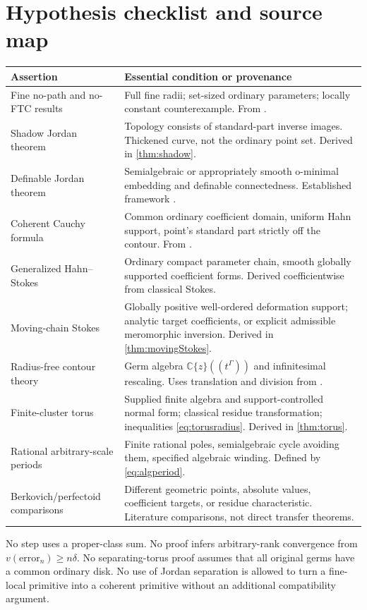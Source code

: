 \documentclass[11pt,letterpaper]{article}
\theoremstyle{definition}
\theoremstyle{remark}
\newcommand{\C}{\mathbb C}
\numberwithin{equation}{section}
\begin{document}
\section{Hypothesis checklist and source map}\label{app:audit}
\begin{center}\small
\begin{longtable}{@{}L{0.28\textwidth}L{0.62\textwidth}@{}}
\toprule
Assertion & Essential condition or provenance\\
\midrule
\endhead
Fine no-path and no-FTC results & Full fine radii; set-sized ordinary parameters; locally constant counterexample. From \cite[\S3]{SA}.\\[0.45em]
Shadow Jordan theorem & Topology consists of standard-part inverse images. Thickened curve, not the ordinary point set. Derived in \cref{thm:shadow}.\\[0.45em]
Definable Jordan theorem & Semialgebraic or appropriately smooth o-minimal embedding and definable connectedness. Established framework \cite{BO}.\\[0.45em]
Coherent Cauchy formula & Common ordinary coefficient domain, uniform Hahn support, point's standard part strictly off the contour. From \cite[\S6]{SA}.\\[0.45em]
Generalized Hahn--Stokes & Ordinary compact parameter chain, smooth globally supported coefficient forms. Derived coefficientwise from classical Stokes.\\[0.45em]
Moving-chain Stokes & Globally positive well-ordered deformation support; analytic target coefficients, or explicit admissible meromorphic inversion. Derived in \cref{thm:movingStokes}.\\[0.45em]
Radius-free contour theory & Germ algebra $\C\{z\}((t^\Gamma))$ and infinitesimal rescaling. Uses translation and division from \cite{AG}.\\[0.45em]
Finite-cluster torus & Supplied finite algebra and support-controlled normal form; classical residue transformation; inequalities \eqref{eq:torusradius}. Derived in \cref{thm:torus}.\\[0.45em]
Rational arbitrary-scale periods & Finite rational poles, semialgebraic cycle avoiding them, specified algebraic winding. Defined by \eqref{eq:algperiod}.\\[0.45em]
Berkovich/perfectoid comparisons & Different geometric points, absolute values, coefficient targets, or residue characteristic. Literature comparisons, not direct transfer theorems.\\
\bottomrule
\end{longtable}
\end{center}
No step uses a proper-class sum. No proof infers arbitrary-rank convergence from $v(\text{error}_n)\ge n\delta$. No separating-torus proof assumes that all original germs have a common ordinary disk. No use of Jordan separation is allowed to turn a fine-local primitive into a coherent primitive without an additional compatibility argument.
\end{document}
